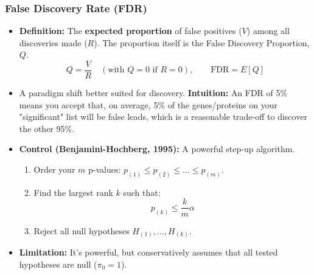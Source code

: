 \documentclass{article}
\newcommand{\piO}{\pi_0}
\begin{document}
\subsubsection*{False Discovery Rate (FDR)}
\begin{itemize}
    \item \textbf{Definition:} The \textbf{expected proportion} of false positives ($V$) among all discoveries made ($R$). The proportion itself is the False Discovery Proportion, $Q$.
    $$ Q = \frac{V}{R} \quad (\text{with } Q=0 \text{ if } R=0), \qquad \text{FDR} = E[Q] $$
    \item  A paradigm shift better suited for discovery. \textbf{Intuition:} An FDR of 5\% means you accept that, on average, 5\% of the genes/proteins on your "significant" list will be false leads, which is a reasonable trade-off to discover the other 95\%.
    \item \textbf{Control (Benjamini-Hochberg, 1995):} A powerful step-up algorithm.
    \begin{enumerate}
        \item Order your $m$ p-values: $p_{(1)} \le p_{(2)} \le \dots \le p_{(m)}$.
        \item Find the largest rank $k$ such that:
        $$ p_{(k)} \le \frac{k}{m}\alpha $$
        \item Reject all null hypotheses $H_{(1)}, \dots, H_{(k)}$.
    \end{enumerate}
    \item \textbf{Limitation:} It's powerful, but conservatively assumes that all tested hypotheses are null ($\piO = 1$).
\end{itemize}
\end{document}
